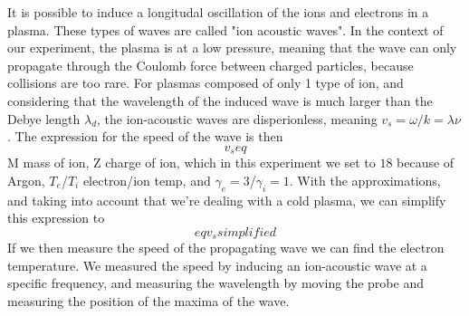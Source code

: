 It is possible to induce a longitudal oscillation of the ions and electrons in a plasma. These types of waves are called "ion acoustic waves". In the context of our experiment, the plasma is at a low pressure, meaning that the wave can only propagate through the Coulomb force between charged particles, because collisions are too rare.
For plasmas composed of only 1 type of ion, and considering that the wavelength of the induced wave is much larger than the Debye length $\lambda_d$, the ion-acoustic waves are disperionless, meaning $v_s = \omega/k = \lambda \nu$. The expression for the speed of the wave is then
\begin{equation}
    v_s eq
\end{equation}
M mass of ion, Z charge of ion, which in this experiment we set to $18$ because of Argon, $T_e$/$T_i$ electron/ion temp, and $\gamma_e=3$/$\gamma_i=1$. With the approximations, and taking into account that we're dealing with a cold plasma, we can simplify this expression to
\begin{equation}
    eq v_s simplified
\end{equation}
If we then measure the speed of the propagating wave we can find the electron temperature. We measured the speed by inducing an ion-acoustic wave at a specific frequency, and measuring the wavelength by moving the probe and measuring the position of the maxima of the wave.
